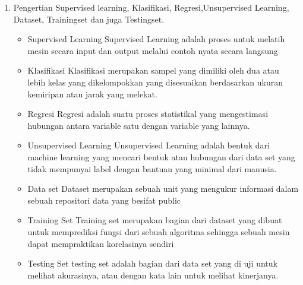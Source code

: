 \begin{enumerate}
	\item Pengertian 
	\hfill\break
	Supervised learning,  Klasifikasi, Regresi,Unsupervised Learning, Dataset, Trainingset dan juga Testingset.
	\begin{itemize}
		\item Supervised Learning
		\hfill\break
	Supervised Learning adalah proses untuk melatih mesin secara input dan output melalui contoh nyata secara langsung
		\item Klasifikasi
		\hfill\break
		Klasifikasi merupakan sampel yang dimiliki oleh dua atau lebih kelas yang dikelompokkan yang disesuaikan berdasarkan ukuran kemiripan atau jarak yang melekat. 
		\item Regresi
		\hfill\break
Regresi adalah suatu proses statistikal yang mengestimasi hubungan antara variable satu dengan variable yang lainnya.
		\item Unsupervised Learning 
		\hfill\break
Unsupervised Learning adalah bentuk dari machine learning yang mencari bentuk atau hubungan dari data set yang tidak mempunyai label dengan bantuan yang minimal dari manusia.
		\item Data set
		\hfill\break
Dataset merupakan sebuah unit yang mengukur informasi dalam sebuah repositori data yang besifat public
		\item Training Set
		\hfill\break
	Training set merupakan bagian dari dataset yang dibuat untuk memprediksi fungsi dari sebuah algoritma sehingga sebuah mesin dapat mempraktikan korelasinya sendiri	
		\item Testing Set
		\hfill\break
testing set adalah bagian dari data set yang di uji untuk melihat akurasinya, atau dengan kata lain untuk melihat kinerjanya.


	\end{itemize}
\end{enumerate}
